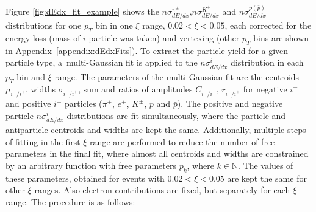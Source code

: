 \noindent Figure \ref{fig:dEdx_fit_example}
shows the $n\sigma^{\pi^\pm}_{dE/dx}$,$n\sigma^{K^\pm}_{dE/dx}$ and $n\sigma^{p(\bar{p})}_{dE/dx}$ distributions for one $p_T$ bin in one $\xi$ range, $0.02 < \xi < 0.05$, each corrected for the energy loss (mass of $i$-particle was taken) and vertexing (other $p_T$ bins are shown in Appendix~\ref{appendix:dEdxFits}). To extract the  particle yield for a given particle type,
a~multi-Gaussian fit is applied to the $n\sigma^i_{dE/dx}$ distribution in each $p_T$ bin and $\xi$ range. The parameters of the multi-Gaussian fit are the centroids $\mu_{i^-/i^+}$, widths $\sigma_{i^-/i^+}$, sum  and ratios  of amplitudes $C_{i^-/i^+}$, $r_{i^-/i^+}$ for negative $i^-$ and positive $i^+$ particles ($\pi^\pm$, $e^\pm$, $K^\pm$, $p$ and $\bar{p}$). The positive and negative particle
$n\sigma^{i}_{dE/dx}$-distributions are fit simultaneously, where the particle
and antiparticle centroids and widths are kept the same. Additionally, multiple steps of fitting in the first $\xi$ range are performed to reduce the number of free parameters in the final fit, where almost all centroids and widths are constrained  by an arbitrary function with free parameters $p_k$, where $k \in \mathbb N$. The values of these parameters, obtained for events with $0.02 < \xi < 0.05$ are kept the same for other $\xi$ ranges.
 Also electron contributions are  fixed, but separately for each $\xi$ range. The procedure is as follows:
